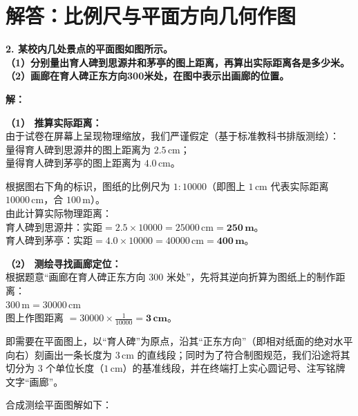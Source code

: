 \documentclass[12pt, a4paper]{ctexrep}
\begin{document}
\section{解答：比例尺与平面方向几何作图}

\vspace{0.6cm}

\textbf{2. 某校内几处景点的平面图如图所示。}\\
\textbf{（1）分别量出育人碑到思源井和茅亭的图上距离，再算出实际距离各是多少米。}\\
\textbf{（2）画廊在育人碑正东方向300米处，在图中表示出画廊的位置。}

\vspace{0.4cm}

\textbf{解：}

\textbf{（1） 推算实际距离：} \\
由于试卷在屏幕上呈现物理缩放，我们严谨假定（基于标准教科书排版测绘）：\\
量得育人碑到思源井的图上距离为 \textbf{$2.5\,\text{cm}$}；\\
量得育人碑到茅亭的图上距离为 \textbf{$4.0\,\text{cm}$}。

根据图右下角的标识，图纸的比例尺为 $1:10000$（即图上 $1\,\text{cm}$ 代表实际距离 $10000\,\text{cm}$，合 $100\,\text{m}$）。\\
由此计算实际物理距离：\\
育人碑到思源井：$\text{实距} = 2.5 \times 10000 = 25000\,\text{cm} = \boldsymbol{250\,\text{m}}$。\\
育人碑到茅亭：$\text{实距} = 4.0 \times 10000 = 40000\,\text{cm} = \boldsymbol{400\,\text{m}}$。

\vspace{0.4cm}

\textbf{（2） 测绘寻找画廊定位：} \\
根据题意“画廊在育人碑正东方向 $300$ 米处”，先将其逆向折算为图纸上的制作距离：\\
$300\,\text{m} = 30000\,\text{cm}$ \\
图上作图距离 $= 30000 \times \frac{1}{10000} = \boldsymbol{3\,\text{cm}}$。

即需要在平面图上，以“育人碑”为原点，沿其“正东方向”（即相对纸面的绝对水平向右）刻画出一条长度为 $3\,\text{cm}$ 的直线段；同时为了符合制图规范，我们沿途将其切分为 $3$ 个单位长度（$1\,\text{cm}$）的基准线段，并在终端打上实心圆记号、注写铭牌文字“画廊”。

\vspace{0.4cm}

合成测绘平面图解如下：
\end{document}

